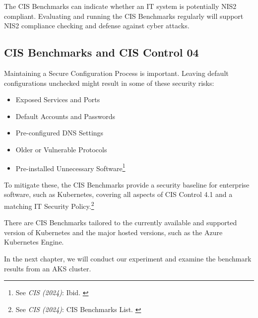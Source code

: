 The CIS Benchmarks can indicate whether an IT system is potentially NIS2 compliant. Evaluating and running the CIS Benchmarks regularly will support NIS2 compliance checking and defense against cyber attacks.

\subsection{CIS Benchmarks and CIS Control 04}

Maintaining a Secure Configuration Process is important. Leaving default configurations unchecked might result in some of these security risks:

\begin{itemize}
    \item Exposed Services and Ports
    \item Default Accounts and Passwords
    \item Pre-configured DNS Settings
    \item Older or Vulnerable Protocols
    \item Pre-installed Unnecessary Software\footnote{See \textit{CIS (2024)}: Ibid. \cite{cisControls}}
\end{itemize}

To mitigate these, the CIS Benchmarks provide a security baseline for enterprise software, such as Kubernetes, covering all aspects of CIS Control 4.1 and a matching IT Security Policy.\footnote{See \textit{CIS (2024)}: CIS Benchmarks List. \cite{cisBenchmarks}}

There are CIS Benchmarks tailored to the currently available and supported version of Kubernetes and the major hosted versions, such as the Azure Kubernetes Engine.

In the next chapter, we will conduct our experiment and examine the benchmark results from an AKS cluster.
